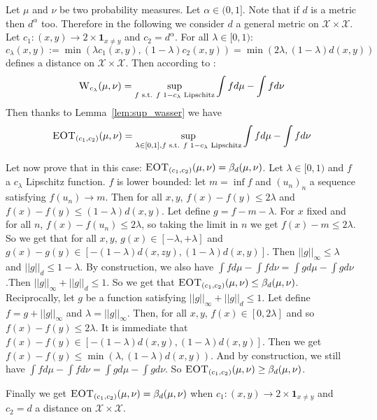 \begin{prv*} 
Let $\mu$ and $\nu$ be two probability measures. Let $\alpha\in (0,1]$. Note that if $d$ is a metric then $d^\alpha$ too. Therefore in the following we consider $d$ a general metric on $\mathcal{X}\times\mathcal{X}$. Let $c_1:(x,y)\rightarrow2\times \mathbf{1}_{x\neq y}$ and $c_2=d^{\alpha}$. For all $\lambda\in[0,1)$:
$$c_\lambda(x,y) := \min(\lambda c_1(x,y),(1-\lambda)c_2(x,y))=\min(2\lambda,(1-\lambda)d(x,y))$$
defines a distance on  $\mathcal{X}\times\mathcal{X}$. Then according to \cite[Theorem 1.14]{villani2003topics}: 
$$\textsc{W}_{c_\lambda}(\mu,\nu)=\sup_{f\text{ s.t. } f\text{ }1-c_\lambda\text{ Lipschitz}}\int fd\mu-\int fd\nu$$
Then thanks to Lemma~\ref{lem:sup_wasser} we have
$$\textsc{EOT}_{(c_1,c_2)}(\mu,\nu) = \sup_{\lambda\in[0,1],f\text{ s.t. } f\text{ }1-c_\lambda\text{ Lipschitz}}\int fd\mu-\int fd\nu$$

Let now prove that in this case: $\textsc{EOT}_{(c_1,c_2)}(\mu,\nu) = \beta_d(\mu,\nu)$. Let $\lambda \in [0,1)$ and $f$ a $c_\lambda$ Lipschitz function. $f$ is lower bounded: let $m = \inf f$ and $(u_n)_n$ a sequence satisfying $f(u_n)\rightarrow m$. Then for all $x,y$, $f(x)-f(y)\leq2\lambda$ and  $f(x)-f(y)\leq(1-\lambda)d(x,y)$. Let define $g=f-m-\lambda$. For $x$ fixed and for all $n$,  $f(x)-f(u_n)\leq2\lambda$, so taking the limit in $n$ we get $f(x)-m\leq2\lambda$.  So we get that for all $x,y$, $g(x)\in[-\lambda,+\lambda]$ and $g(x)-g(y)\in[-(1-\lambda)d(x,zy),(1-\lambda)d(x,y)]$. Then $||g||_\infty\leq \lambda$ and $||g||_d\leq 1-\lambda$. By construction, we also have $\int fd\mu-\int fd\nu=\int gd\mu-\int gd\nu$.Then $||g||_\infty+||g||_d\leq 1$. So we get that $\textsc{EOT}_{(c_1,c_2)}(\mu,\nu) \leq \beta_d(\mu,\nu)$.\\
Reciprocally, let $g$ be a function satisfying $||g||_\infty+||g||_d\leq 1$. Let define $f=g+||g||_\infty$ and $\lambda = ||g||_\infty$. Then, for all $x,y$, $f(x)\in[0,2\lambda]$ and so $f(x)-f(y)\leq 2\lambda$. It is immediate that $f(x)-f(y)\in[-(1-\lambda)d(x,y),(1-\lambda)d(x,y)]$. Then we get $f(x)-f(y)\leq \min(\lambda,(1-\lambda)d(x,y))$. And by construction, we still have $\int fd\mu-\int fd\nu=\int gd\mu-\int gd\nu$. So $\textsc{EOT}_{(c_1,c_2)}(\mu,\nu) \geq \beta_d(\mu,\nu)$.

\medskip

Finally we get $\textsc{EOT}_{(c_1,c_2)}(\mu,\nu) = \beta_d(\mu,\nu)$ when $c_1:(x,y)\rightarrow2\times \mathbf{1}_{x\neq y}$ and $c_2=d$ a distance on $\mathcal{X}\times\mathcal{X}$.
\end{prv*}



